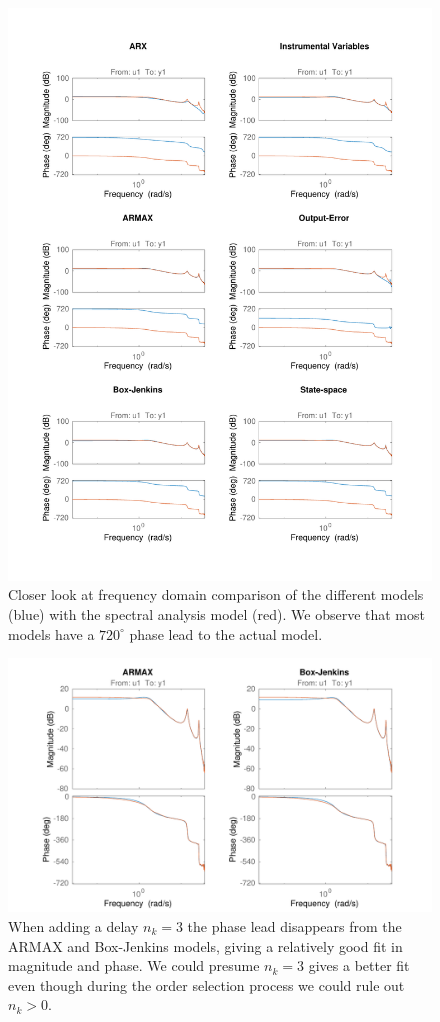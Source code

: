 \documentclass[a4paper,11pt]{article}
\begin{document}
\begin{figure}[H]
\centering
\includegraphics[width = 16cm]{images/4_freq_visual_comp}
\caption{Closer look at frequency domain comparison of the different models (blue) with the spectral analysis model (red). We observe that most models have a $720^\circ$ phase lead to the actual model.}
\label{fig:freq_vsual_comp}
\end{figure}

\begin{figure}[H]
\centering
\includegraphics[width = 16cm]{images/4_freq_nk3_armax_bj}
\caption{When adding a delay $n_k = 3$ the phase lead disappears from the ARMAX and Box-Jenkins models, giving a relatively good fit in magnitude and phase. We could presume $n_k = 3$ gives a better fit even though during the order selection process we could rule out $n_k > 0$.}
\label{fig:freq_nk3_armax_bj}
\end{figure}
\end{document}
